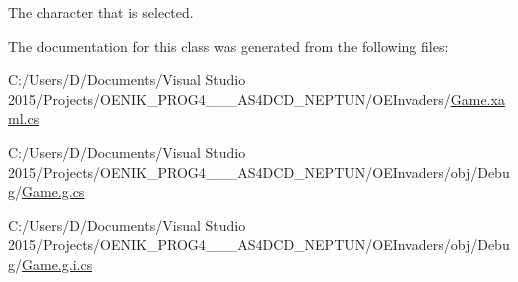 The character that is selected. 



The documentation for this class was generated from the following files\+:\begin{DoxyCompactItemize}
\item 
C\+:/\+Users/\+D/\+Documents/\+Visual Studio 2015/\+Projects/\+O\+E\+N\+I\+K\+\_\+\+P\+R\+O\+G4\+\_\+\_\+\_\+\+A\+S4\+D\+C\+D\+\_\+\+N\+E\+P\+T\+U\+N/\+O\+E\+Invaders/\mbox{\hyperlink{_game_8xaml_8cs}{Game.\+xaml.\+cs}}\item 
C\+:/\+Users/\+D/\+Documents/\+Visual Studio 2015/\+Projects/\+O\+E\+N\+I\+K\+\_\+\+P\+R\+O\+G4\+\_\+\_\+\_\+\+A\+S4\+D\+C\+D\+\_\+\+N\+E\+P\+T\+U\+N/\+O\+E\+Invaders/obj/\+Debug/\mbox{\hyperlink{_game_8g_8cs}{Game.\+g.\+cs}}\item 
C\+:/\+Users/\+D/\+Documents/\+Visual Studio 2015/\+Projects/\+O\+E\+N\+I\+K\+\_\+\+P\+R\+O\+G4\+\_\+\_\+\_\+\+A\+S4\+D\+C\+D\+\_\+\+N\+E\+P\+T\+U\+N/\+O\+E\+Invaders/obj/\+Debug/\mbox{\hyperlink{_game_8g_8i_8cs}{Game.\+g.\+i.\+cs}}\end{DoxyCompactItemize}

